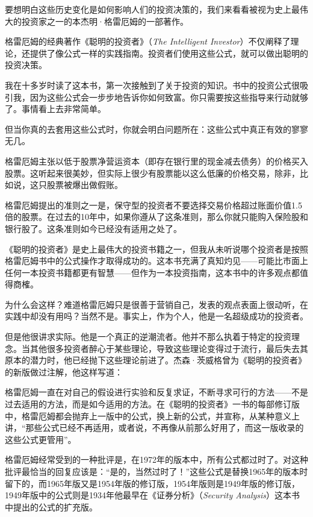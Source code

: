 要想明白这些历史变化是如何影响人们的投资决策的，我们来看看被视为史上最伟大的投资家之一的本杰明·格雷厄姆的一部著作。

格雷厄姆的经典著作《聪明的投资者》（\textit{The Intelligent Investor}）不仅阐释了理论，还提供了像公式一样的实践指南。投资者们使用这些公式，就可以做出聪明的投资决策。

我在十多岁时读了这本书，第一次接触到了关于投资的知识。书中的投资公式很吸引我，因为这些公式会一步步地告诉你如何致富。你只需要按这些指导来行动就够了。事情看上去非常简单。

但当你真的去套用这些公式时，你就会明白问题所在：这些公式中真正有效的寥寥无几。

格雷厄姆主张以低于股票净营运资本（即存在银行里的现金减去债务）的价格买入股票。这听起来很美妙，但实际上很少有股票能以这么低廉的价格交易，除非，比如说，这只股票被爆出做假账。

格雷厄姆提出的准则之一是，保守型的投资者不要选择交易价格超过账面价值1.5倍的股票。在过去的10年中，如果你遵从了这条准则，那么你就只能购入保险股和银行股了。这条准则如今已经没有适用之处了。

《聪明的投资者》是史上最伟大的投资书籍之一，但我从未听说哪个投资者是按照格雷厄姆书中的公式操作才取得成功的。这本书充满了真知灼见——可能比市面上任何一本投资书籍都更有智慧——但作为一本投资指南，这本书中的许多观点都值得商榷。

为什么会这样？难道格雷厄姆只是很善于营销自己，发表的观点表面上很动听，在实践中却没有用吗？当然不是。事实上，作为个人，他是一名超级成功的投资者。

但是他很讲求实际。他是一个真正的逆潮流者。他并不那么执着于特定的投资理念。当其他很多投资者醉心于某些理论，导致这些理论变得过于流行，最后失去其原本的潜力时，他已经抛下这些理论前进了。杰森·茨威格曾为《聪明的投资者》的新版做过注解，他这样写道：

{\kaishu

格雷厄姆一直在对自己的假设进行实验和反复求证，不断寻求可行的方法——不是过去适用的方法，而是如今适用的方法。在《聪明的投资者》一书的每部修订版中，格雷厄姆都会抛弃上一版中的公式，换上新的公式，并宣称，从某种意义上讲，“那些公式已经不再适用，或者说，不再像从前那么好用了，而这一版收录的这些公式更管用”。

格雷厄姆经常受到的一种批评是，在1972年的版本中，所有公式都过时了。对这种批评最恰当的回复应该是：“是的，当然过时了！”这些公式是替换1965年的版本时留下的，而1965年版又是1954年版的修订版，1954年版则是1949年版的修订版，1949年版中的公式则是1934年他最早在《证券分析》（\textit{Security Analysis}）这本书中提出的公式的扩充版。

}

